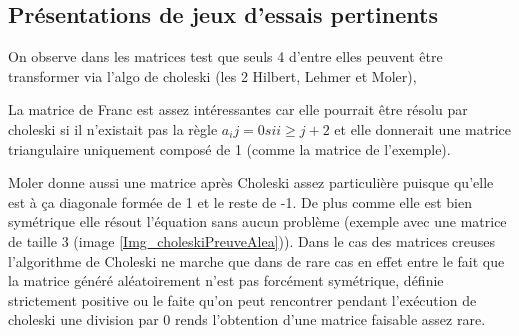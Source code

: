 \documentclass[12pt]{article}
\begin{document}
\subsection{Présentations de jeux d'essais pertinents}



On observe dans les matrices test que seuls 4 d’entre elles peuvent être transformer via l’algo de choleski (les 2 Hilbert, Lehmer et Moler), 

La matrice de Franc est assez intéressantes car elle pourrait être résolu par choleski si il n’existait pas la règle $ a_ij = 0 si i \geq j+2 $  et elle donnerait une matrice triangulaire uniquement 
composé de 1 (comme la matrice de l'exemple).

Moler donne aussi une matrice après Choleski assez particulière puisque qu’elle est à ça diagonale formée de 1 et le reste de -1. De plus comme elle est bien symétrique elle résout l’équation sans aucun problème (exemple avec une matrice de taille 3 (image \ref{Img_choleskiPreuveAlea})). Dans le cas des matrices creuses l'algorithme de Choleski ne marche que dans de rare cas en effet entre le fait que la matrice généré aléatoirement n'est pas forcément symétrique, définie strictement positive ou le faite qu'on peut rencontrer pendant l'exécution de choleski une division par 0 rends l'obtention d'une matrice faisable assez rare.
\end{document}
